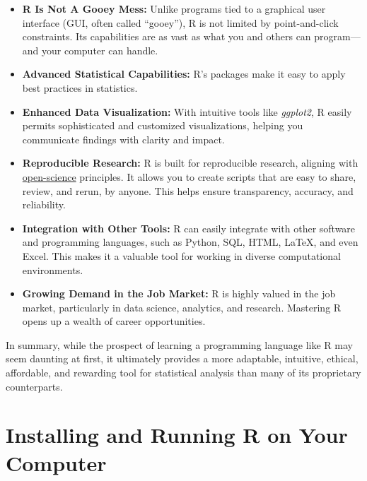 \begin{itemize}

    \item \textbf{R Is Not A Gooey Mess:} Unlike programs tied to a graphical user interface (GUI, often called ``gooey''), R is not limited by point-and-click constraints. Its capabilities are as vast as what you and others can program—and your computer can handle.
    
    \item \textbf{Advanced Statistical Capabilities:} R's packages make it easy to apply best practices in statistics.
    
    \item \textbf{Enhanced Data Visualization:} With intuitive tools like \textit{ggplot2}, R easily permits sophisticated and customized visualizations, helping you communicate findings with clarity and impact.
    
    \item \textbf{Reproducible Research:} R is built for reproducible research, aligning with \href{https://unesdoc.unesco.org/ark:/48223/pf0000379949}{open-science} principles. It allows you to create scripts that are easy to share, review, and rerun, by anyone. This helps ensure transparency, accuracy, and reliability.
    
    \item \textbf{Integration with Other Tools:} R can easily integrate with other software and programming languages, such as Python, SQL, HTML, \LaTeX, and even Excel. This makes it a valuable tool for working in diverse computational environments.
    
    \item \textbf{Growing Demand in the Job Market:} R is highly valued in the job market, particularly in data science, analytics, and research. Mastering R opens up a wealth of career opportunities.
    
\end{itemize}

In summary, while the prospect of learning a programming language like R may seem daunting at first, it ultimately provides a more adaptable, intuitive, ethical, affordable, and rewarding tool for statistical analysis than many of its proprietary counterparts.

\section{Installing and Running R on Your Computer}

